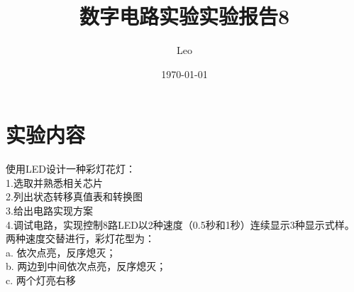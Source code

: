 \documentclass{ctexart}
\title{数字电路实验\quad 实验报告8}
\author{Leo}
\date{\today}
\begin{document}
\maketitle
\section{实验内容}
\noindent 使用LED设计一种彩灯花灯：\\
1.选取并熟悉相关芯片\\
2.列出状态转移真值表和转换图 \\
3.给出电路实现方案\\
4.调试电路，实现控制8路LED以2种速度（0.5秒和1秒）连续显示3种显示式样。两种速度交替进行，彩灯花型为：\\
a.	依次点亮，反序熄灭；\\
b.	两边到中间依次点亮，反序熄灭；\\
c.	两个灯亮右移\\
\end{document}
